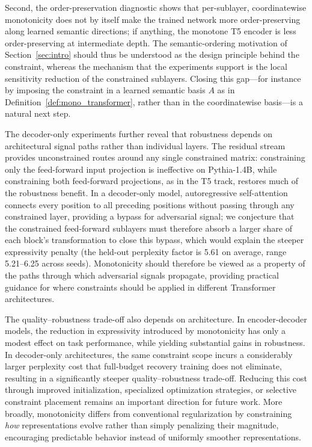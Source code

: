 \documentclass{article}
\theoremstyle{plain}
\theoremstyle{definition}
\theoremstyle{remark}
\theoremstyle{plain}
\begin{document}
Second, the order-preservation diagnostic shows that per-sublayer, coordinatewise monotonicity does not by itself make the trained network more order-preserving along learned semantic directions; if anything, the monotone T5 encoder is less order-preserving at intermediate depth. The semantic-ordering motivation of Section~\ref{sec:intro} should thus be understood as the design principle behind the constraint, whereas the mechanism that the experiments support is the local sensitivity reduction of the constrained sublayers. Closing this gap---for instance by imposing the constraint in a learned semantic basis $A$ as in Definition~\ref{def:mono_transformer}, rather than in the coordinatewise basis---is a natural next step.

The decoder-only experiments further reveal that robustness depends on architectural signal paths rather than individual layers. The residual stream provides unconstrained routes around any single constrained matrix: constraining only the feed-forward input projection is ineffective on Pythia-1.4B, while constraining both feed-forward projections, as in the T5 track, restores much of the robustness benefit. In a decoder-only model, autoregressive self-attention connects every position to all preceding positions without passing through any constrained layer, providing a bypass for adversarial signal; we conjecture that the constrained feed-forward sublayers must therefore absorb a larger share of each block's transformation to close this bypass, which would explain the steeper expressivity penalty (the held-out perplexity factor is 5.61 on average, range 5.21--6.25 across seeds).
Monotonicity should therefore be viewed as a property of the paths through which adversarial signals propagate, providing practical guidance for where constraints should be applied in different Transformer architectures.

The quality--robustness trade-off also depends on architecture. In encoder-decoder models, the reduction in expressivity
introduced by monotonicity has only a modest effect on task
performance, while yielding substantial gains in robustness. In
decoder-only architectures, the same constraint scope incurs a
considerably larger perplexity cost that full-budget recovery
training does not eliminate, resulting in a significantly steeper
quality--robustness trade-off.
Reducing this cost through improved initialization, specialized optimization strategies, or selective constraint placement remains an important direction for future work. More broadly, monotonicity differs from conventional regularization by constraining \emph{how} representations evolve rather than simply penalizing their magnitude, encouraging predictable behavior instead of uniformly smoother representations.
\end{document}
